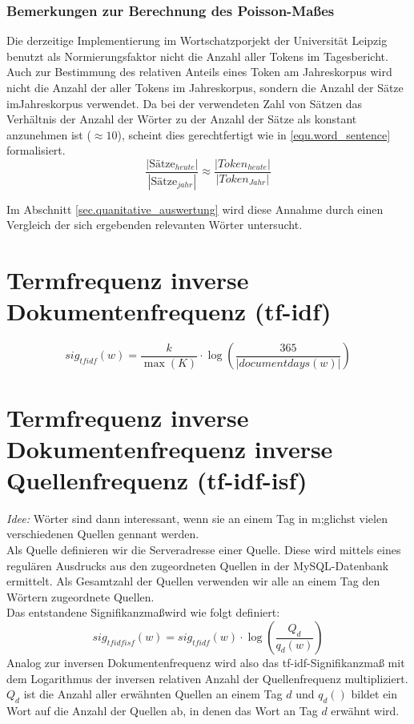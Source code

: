 \subsubsection{Bemerkungen zur Berechnung des Poisson-Maßes}
Die derzeitige Implementierung im Wortschatzporjekt der Universität Leipzig benutzt als Normierungsfaktor nicht die Anzahl aller Tokens im Tagesbericht. Auch zur Bestimmung des relativen Anteils eines Token am Jahreskorpus wird nicht die Anzahl der aller Tokens im Jahreskorpus, sondern die Anzahl der Sätze imJahreskorpus verwendet. Da bei der verwendeten Zahl von Sätzen das Verhältnis der Anzahl der Wörter zu der Anzahl der Sätze als konstant anzunehmen ist ($\approx 10$), scheint dies gerechtfertigt wie in \ref{equ.word_sentence} formalisiert. 
\begin{equation}\label{equ.word_sentence}
\frac{|\text{Sätze}_{heute}|}{|\text{Sätze}_{jahr}|} \approx \frac{|Token_{heute}|}{|Token_{Jahr}|}
\end{equation}

Im Abschnitt \ref{sec.quanitative_auswertung} wird diese Annahme durch einen Vergleich der sich ergebenden relevanten Wörter untersucht.

\section{Termfrequenz inverse Dokumentenfrequenz (tf-idf)}
 \begin{equation}
sig_{tf idf}(w) = \frac{k}{\max(K)} \cdot \log ( \frac{365}{|documentdays(w)|})
\end{equation}

\section{Termfrequenz inverse Dokumentenfrequenz inverse Quellenfrequenz (tf-idf-isf)}
\emph{Idee: } Wörter sind dann interessant, wenn sie an einem Tag in m;glichst vielen verschiedenen Quellen gennant werden.\\
Als Quelle definieren wir die Serveradresse einer Quelle. Diese wird mittels eines regulären Ausdrucks aus den zugeordneten Quellen in der MySQL-Datenbank ermittelt. Als Gesamtzahl der Quellen verwenden wir alle an einem Tag den Wörtern zugeordnete Quellen.\\
Das entstandene Signifikanzmaßwird wie folgt definiert:
 \begin{equation}
sig_{tf idf isf}(w) = sig_{tf idf}(w) \cdot \log ( \frac{Q_d}{q_d(w)})
\end{equation}
Analog zur inversen Dokumentenfrequenz wird also das tf-idf-Signifikanzmaß mit dem Logarithmus der inversen relativen Anzahl der Quellenfrequenz multipliziert. $Q_d$ ist die Anzahl aller erwähnten Quellen an einem Tag $d$ und $q_d()$ bildet ein Wort auf die Anzahl der Quellen ab, in denen das Wort an Tag $d$  erwähnt wird. 

